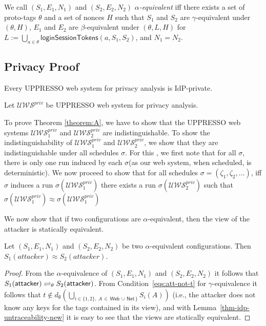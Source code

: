 \begin{theorem}
  \begin{definition}
    We call $(S_1,E_1,N_1)$ and $(S_2,E_2,N_2)$
    \emph{$\alpha$-equivalent} iff there exists a set of proto-tags
    $\theta$ and a set of nonces $H$ such that $S_1$ and $S_2$ are
    $\gamma$-equivalent under $(\theta,H)$, $E_1$ and $E_2$ are
    $\beta$-equivalent under $(\theta,L,H)$ for
    $L := \bigcup_{a\in\theta} \mathsf{loginSessionTokens}(a,S_1,S_2)$,
    and $N_1 = N_2$.
  \end{definition}
  
  \subsection{Privacy Proof}
  
  \begin{theorem} \label{theorem:A}Every UPPRESSO web system for privacy analysis is IdP-private.
  \end{theorem}
  
  Let $\mathcal{U\!W\!S}^{priv}$ be UPPRESSO web system for privacy analysis.\par
  To prove Theorem \ref{theorem:A}, we have to show that the UPPRESSO web systems $\mathcal{U\!W\!S}^{priv}_1$ and $\mathcal{U\!W\!S}^{priv}_2$ 
  are indistinguishable. To show the indistinguishability of $\mathcal{U\!W\!S}^{priv}_1$ and $\mathcal{U\!W\!S}^{priv}_2$, 
  we show that they are indistinguishable under all schedules $\sigma$.
  For this , we first note that for all $\sigma$, there is only one run induced by each $\sigma$(as our web system, when scheduled, is deterministic).
  We now proceed to show that for all schedules $\sigma=(\zeta _1, \zeta_2,\dots)$, iff $\sigma$ induces a run $\sigma(\mathcal{U\!W\!S}^{priv}_1)$ there exists a run $\sigma(\mathcal{U\!W\!S}^{priv}_2)$ such that $\sigma(\mathcal{U\!W\!S}^{priv}_1)\approx\sigma(\mathcal{U\!W\!S}^{priv}_1)$\par
  We now show that if two configurations are $\alpha$-equivalent, then the view of the attacker is statically equivalent.
  
  \begin{lemma}
    Let $(S_1,E_1,N_1)$ and $(S_2,E_2,N_2)$ be two 
    $\alpha$-equivalent configurations. 
    Then $S_1(attacker)\approx S_2(attacker)$.
  \end{lemma}
  \begin{proof}
    From the $\alpha$-equivalence of $(S_1,E_1,N_1)$ and 
    $(S_2,E_2,N_2)$ it follows that $S_1(\mathsf{attacker}) 
    \rightleftharpoons_{\theta} S_2(\mathsf{attacker})$.
    From Condition~\ref{eqs:att-not-t} for $\gamma$-equivalence 
    it follows that
    $t \not\in d_\emptyset(\bigcup_{i \in \{1,2\},\ A\, \in\, 
    \mathsf{Web}\, \cup \, \mathsf{Net}\, \}}S_i(A))$
    (i.e., the attacker does not know any keys for the tags 
    contained in its view), and with Lemma~\ref{thm-idp-untraceability-new} it is easy to see 
    that the views are statically equivalent.
  \end{proof}


\end{theorem}
